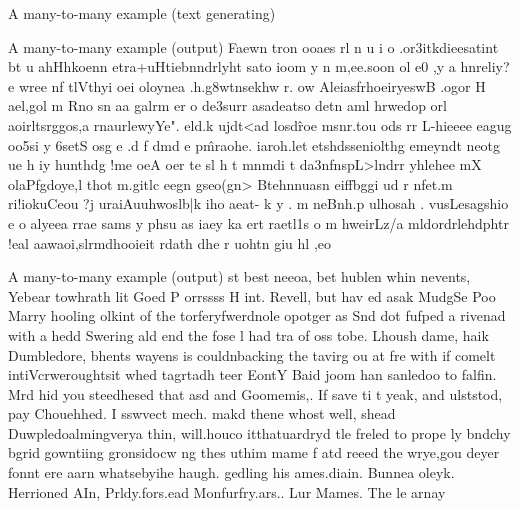 \documentclass[10pt]{beamer}
\begin{document}
\begin{frame}{A many-to-many example (text generating)}
\lstI
\end{frame}



\begin{frame}{A many-to-many example (output)}
  Faewn tron ooaes  rl n   u i o .or3itkdieesatint  bt u ahHhkoenn
  etra+uHtiebnndrlyht sato  ioom y  n m,ee.soon ol e0  ,y a hnreliy?e
  wree nf tlVthyi  oei oloynea .h.g8wtnsekhw r. ow AleiasfrhoeiryeswB
  .ogor H ael,gol m Rno sn aa  galrm er o de3surr asadeatso  detn %
  aml hrwedop orl aoirltsrggos,a  rnaurlewyYe". eld.k ujdt<ad losd\^roe
  msnr.tou ods rr L-hieeee eagug oo5si y 6setS  osg e .d f dmd e p\^mraohe.
  iaroh.let  etshdsseniolthg emeyndt neotg ue h iy hunthdg !me  oeA oer
  te sl h t mnmdi t da3nfnspL>lndrr yhlehee mX  olaPfgdoye,l thot m.gitlc
  eegn gseo(gn> Btehnnuasn eiffbggi ud  r nfet.m ri!iokuCeou  ?j
  uraiAuuhwoslb|k  iho aeat- k y   . m neBnh.p ulhosah . vusLesagshio e o
  alyeea rrae   sams   y phsu as  iaey ka ert   raetl1s  o m hweirLz/a
  mldordrlehdphtr !eal  aawaoi,slrmdhooieit  rdath dhe r uohtn  giu hl  ,eo
\end{frame}

\begin{frame}{A many-to-many example (output)}
  st best neeoa, bet hublen  whin nevents, Yebear towhrath lit Goed P orrssss H
  int. Revell, but hav ed asak MudgSe Poo
  Marry hooling olkint of the torferyfwerdnole opotger as  Snd dot fufped a rivenad with a hedd Swering ald end the fose l had tra of oss tobe. Lhoush dame, haik  Dumbledore, bhents wayens is couldnbacking the tavirg ou at fre with if comelt intiVcrweroughtsit whed tagrtadh teer EontY Baid joom han sanledoo to falfin. Mrd hid you steedhesed that asd and Goomemis,. If save ti t  yeak, and ulststod, pay Chouehhed. I sswvect mech. makd thene whost well, shead Duwpledoalmingverya thin, will.houco itthatuardryd tle freled to prope ly bndchy bgrid gowntiing gronsidocw ng thes uthim mame f atd reeed the  wrye,gou deyer fonnt ere aarn whatsebyihe haugh. gedling his ames.diain. Bunnea oleyk. Herrioned
  AIn, Prldy.fors.ead Monfurfry.ars.. Lur Mames. The le arnay
\end{frame}
\end{document}
